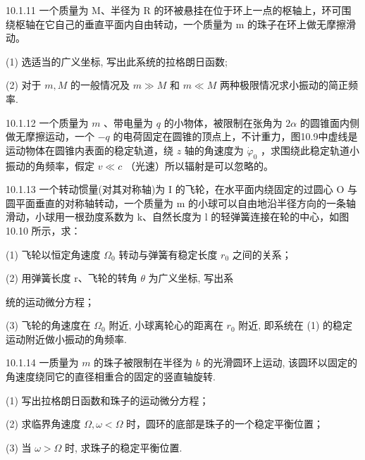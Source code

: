 \begin{problem}{10.1.11}
一个质量为 M、半径为 R 的环被悬挂在位于环上一点的枢轴上，环可围绕枢轴在它自己的垂直平面内自由转动，一个质量为 m 的珠子在环上做无摩擦滑动。

(1) 选适当的广义坐标, 写出此系统的拉格朗日函数;

(2) 对于 $m, M$ 的一般情况及 $m \gg M$ 和 $m \ll M$ 两种极限情况求小振动的简正频率.
\begin{center}

\end{center}
\end{problem}
\clearpage


\begin{problem}{10.1.12}
一个质量为 $m$ 、带电量为 $q$ 的小物体，被限制在张角为 $2\alpha$ 的圆锥面内侧做无摩擦运动，一个 $-q$ 的电荷固定在圆锥的顶点上，不计重力，图10.9中虚线是运动物体在圆锥内表面的稳定轨道，绕 $z$ 轴的角速度为 $\dot{\varphi}_0$ ，求围绕此稳定轨道小振动的角频率，假定 $v \ll c$ （光速）所以辐射是可以忽略的。
\begin{center}

\end{center}
\end{problem}
\clearpage


\begin{problem}{10.1.13}
一个转动惯量(对其对称轴)为 I 的飞轮，在水平面内绕固定的过圆心 O 与圆平面垂直的对称轴转动，一个质量为 m 的小球可以自由地沿半径方向的一条轴滑动，小球用一根劲度系数为 k、自然长度为 l 的轻弹簧连接在轮的中心，如图 10.10 所示，求：

(1) 飞轮以恒定角速度 $\Omega_{0}$ 转动与弹簧有稳定长度 $r_{0}$ 之间的关系；

(2) 用弹簧长度 r、飞轮的转角 $\theta$ 为广义坐标, 写出系

统的运动微分方程；

(3) 飞轮的角速度在 $\Omega_{0}$ 附近, 小球离轮心的距离在 $r_{0}$ 附近, 即系统在 (1) 的稳定运动附近做小振动的角频率.
\begin{center}

\end{center}
\end{problem}
\clearpage


\begin{problem}{10.1.14}
一质量为 $m$ 的珠子被限制在半径为 $b$ 的光滑圆环上运动, 该圆环以固定的角速度绕同它的直径相重合的固定的竖直轴旋转.

(1) 写出拉格朗日函数和珠子的运动微分方程；

(2) 求临界角速度 $\Omega, \omega < \Omega$ 时，圆环的底部是珠子的一个稳定平衡位置；

(3) 当 $\omega > \Omega$ 时, 求珠子的稳定平衡位置.
\end{problem}
\clearpage


